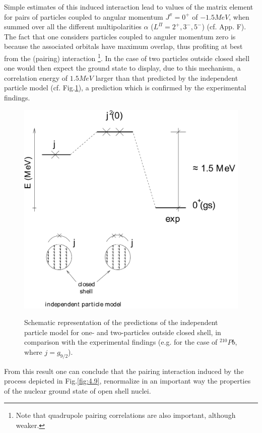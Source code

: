 \documentclass[a4paper,14pt]{book}
\begin{document}
Simple estimates of this induced interaction lead to values of the matrix element for pairs of particles coupled to angular momentum $J^{\pi} = 0^+$ of $-1.5 MeV$, when summed over all the different multipolarities $\alpha$ ($L^{\Pi}=2^+,3^-,5^-$) (cf. App. F). The fact that one considers particles coupled to anguler momentum zero is because the associated orbitals have maximum overlap, thus profiting at best from the (pairing) interaction \footnote{Note that quadrupole pairing correlations are also important, although weaker.}. In the case of two particles outside closed shell one would then expect the ground state to display, due to this mechanism, a correlation energy of $1.5 MeV$ larger than that predicted by the independent particle model (cf. Fig.\ref{fig:4.10}), a prediction which is confirmed by the experimental findings.

\begin{figure}[h!]
\centerline {
{\includegraphics*[width=\textwidth]{figs_C4S/fig_4_10}}
}
\caption{Schematic representation of the predictions of the independent particle model for one- and two-particles outside closed shell, in comparison with the experimental findings (e.g. for the case of $^{210}Pb$, where $j=g_{9/2}$).}
\label{fig:4.10}
\end{figure}

\noindent From this result one can conclude that the pairing interaction induced by the process depicted in Fig.\ref{fig:4.9}, renormalize in an important way the properties of the nuclear ground state of open shell nuclei.
\end{document}
